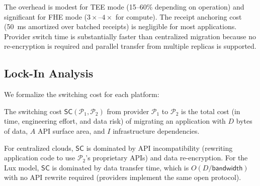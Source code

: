 The overhead is modest for TEE mode (15--60\% depending on operation)
and significant for FHE mode ($3\times$--$4\times$ for compute). The
receipt anchoring cost (50~ms amortized over batched receipts) is
negligible for most applications. Provider switch time is substantially
faster than centralized migration because no re-encryption is required
and parallel transfer from multiple replicas is supported.

\subsection{Lock-In Analysis}

We formalize the switching cost for each platform:

\begin{definition}
The switching cost $\mathsf{SC}(\mathcal{P}_1, \mathcal{P}_2)$ from provider
$\mathcal{P}_1$ to $\mathcal{P}_2$ is the total cost (in time, engineering
effort, and data risk) of migrating an application with $D$ bytes of data,
$A$ API surface area, and $I$ infrastructure dependencies.
\end{definition}

For centralized clouds, $\mathsf{SC}$ is dominated by API incompatibility
(rewriting application code to use $\mathcal{P}_2$'s proprietary APIs) and
data re-encryption. For the Lux model, $\mathsf{SC}$ is dominated by data
transfer time, which is $O(D / \mathsf{bandwidth})$ with no API rewrite
required (providers implement the same open protocol).

